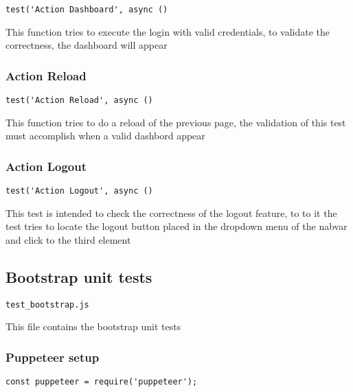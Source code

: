 \documentclass[a4paper]{article}
\begin{document}
\begin{lstlisting}
test('Action Dashboard', async ()
\end{lstlisting}

This function tries to execute the login with valid credentials, to validate
the correctness, the dashboard will appear

\hypertarget{toc31}{}
\subsubsection{Action Reload}

\begin{lstlisting}
test('Action Reload', async ()
\end{lstlisting}

This function tries to do a reload of the previous page, the validation of
this test must accomplish when a valid dashbord appear

\hypertarget{toc32}{}
\subsubsection{Action Logout}

\begin{lstlisting}
test('Action Logout', async ()
\end{lstlisting}

This test is intended to check the correctness of the logout feature, to
to it the test tries to locate the logout button placed in the dropdown
menu of the nabvar and click to the third element

\hypertarget{toc33}{}
\subsection{Bootstrap unit tests}

\begin{lstlisting}
test_bootstrap.js
\end{lstlisting}

This file contains the bootstrap unit tests

\hypertarget{toc34}{}
\subsubsection{Puppeteer setup}

\begin{lstlisting}
const puppeteer = require('puppeteer');
\end{lstlisting}
\end{document}
